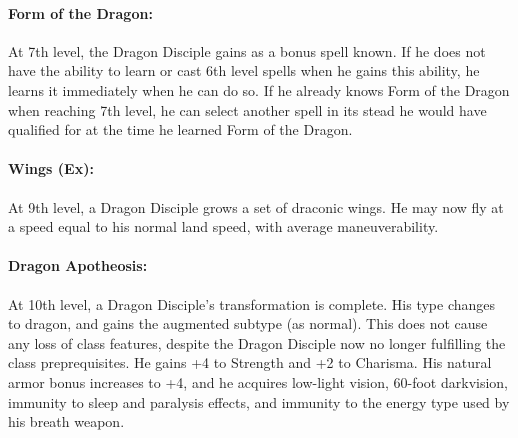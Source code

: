 \paragraph{Form of the Dragon:}
At 7th level, the Dragon Disciple gains  as a bonus spell known.
If he does not have the ability to learn or cast 6th level spells when he gains this ability,
he learns it immediately when he can do so.
If he already knows Form of the Dragon when reaching 7th level, 
he can select another spell in its stead he would have qualified for at the time he learned Form of the Dragon.
\paragraph{Wings (Ex):}
At 9th level, a Dragon Disciple grows a set of draconic wings. 
He may now fly at a speed equal to his normal land speed, with average maneuverability.
\paragraph{Dragon Apotheosis:}
At 10th level, a Dragon Disciple's transformation is complete. His type changes to dragon, and gains the augmented subtype (as normal).
This does not cause any loss of class features, despite the Dragon Disciple now no longer fulfilling the class preprequisites.
He gains +4 to Strength and +2 to Charisma.
His natural armor bonus increases to +4, and he acquires low-light vision, 60-foot darkvision, 
immunity to sleep and paralysis effects, and immunity to the energy type used by his breath weapon.